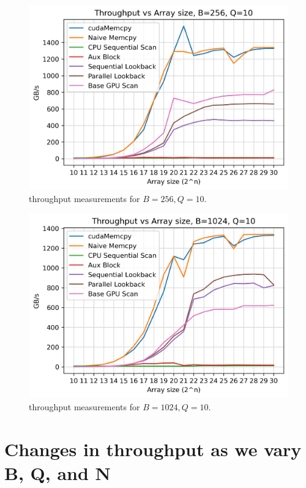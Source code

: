 \documentclass[twocolumn]{article}
\begin{document}
\begin{figure}[h]
    \centering
    \includegraphics[width=\linewidth]{report/plots/throughput_vs_array_size_B256_Q10.png}
    \caption{throughput measurements for $B=256,Q=10$.}
    \label{fig:plot_256_10}
\end{figure}

\begin{figure}[h]
    \centering
    \includegraphics[width=\linewidth]{report/plots/throughput_vs_array_size_B1024_Q10.png}
    \caption{throughput measurements for $B=1024,Q=10$.}
    \label{fig:plot_1024_10}
\end{figure}

\section{Changes in throughput as we vary B, Q, and N}
\end{document}

